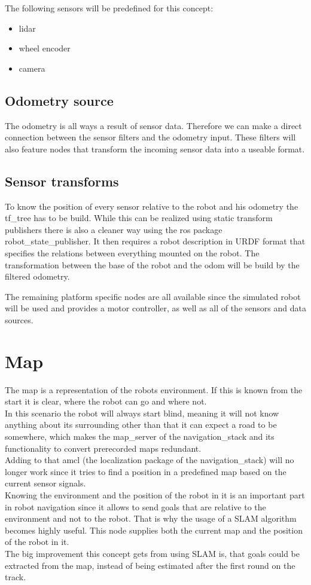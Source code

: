 The following sensors will be predefined for this concept:

\begin{itemize}
	\item lidar
	\item wheel encoder
	\item camera
\end{itemize}


\subsection{Odometry source}
The odometry is all ways a result of sensor data. Therefore we can make a direct connection between the sensor filters and the odometry input. These filters will also feature nodes that transform the incoming sensor data into a useable format.

\subsection{Sensor transforms}
To know the position of every sensor relative to the robot and his odometry the tf\_tree has to be build. While this can be realized using static transform publishers there is also a cleaner way using the ros package robot\_state\_publisher. It then requires a robot description in URDF format that specifies the relations between everything mounted on the robot.
The transformation between the base of the robot and the odom will be build by the filtered odometry.

The remaining platform specific nodes are all available since the simulated robot will be used and provides a motor controller, as well as all of the sensors and data sources.

\section{Map}

The map is a representation of the robots environment. If this is known from the start it is clear, where the robot can go and where not.\\
 In this scenario the robot will always start blind, meaning it will not know anything about its surrounding other than that it can expect a road to be somewhere, which makes the map\_server of the navigation\_stack and its functionality to convert prerecorded maps redundant.\\
Adding to that amcl (the localization package of the navigation\_stack) will no longer work since it tries to find a position in a predefined map based on the current sensor signals.\\
Knowing the environment and the position of the robot in it is an important part in robot navigation since it allows to send goals that are relative to the environment and not to the robot. That is why the usage of a SLAM algorithm becomes highly useful. This node supplies both the current map and the position of the robot in it.\\
The big improvement this concept gets from using SLAM is, that goals could be extracted from the map, instead of being estimated after the first round on the track.

